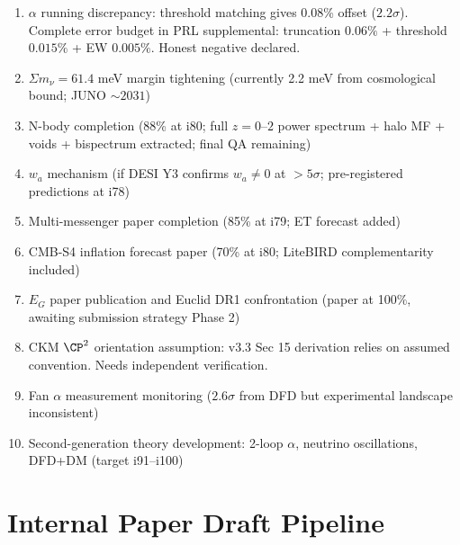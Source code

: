 \documentclass[11pt,a4paper]{article}
\begin{document}
\begin{enumerate}
\item $\alpha$ running discrepancy: threshold matching gives 0.08\% offset ($2.2\sigma$). Complete error budget in PRL supplemental: truncation $0.06\%$ + threshold $0.015\%$ + EW $0.005\%$. Honest negative declared.
\item $\Sigma m_\nu = 61.4$ meV margin tightening (currently 2.2 meV from cosmological bound; JUNO $\sim 2031$)
\item N-body completion (88\% at i80; full $z=0$--$2$ power spectrum + halo MF + voids + bispectrum extracted; final QA remaining)
\item $w_a$ mechanism (if DESI Y3 confirms $w_a \neq 0$ at $> 5\sigma$; pre-registered predictions at i78)
\item Multi-messenger paper completion (85\% at i79; ET forecast added)
\item CMB-S4 inflation forecast paper (70\% at i80; LiteBIRD complementarity included)
\item $E_G$ paper publication and Euclid DR1 confrontation (paper at 100\%, awaiting submission strategy Phase 2)
\item CKM $\CP^2$ orientation assumption: v3.3 Sec 15 derivation relies on assumed convention. Needs independent verification.
\item Fan $\alpha$ measurement monitoring ($2.6\sigma$ from DFD but experimental landscape inconsistent)
\item Second-generation theory development: 2-loop $\alpha$, neutrino oscillations, DFD+DM (target i91--i100)
\end{enumerate}

\section{Internal Paper Draft Pipeline}
\end{document}
